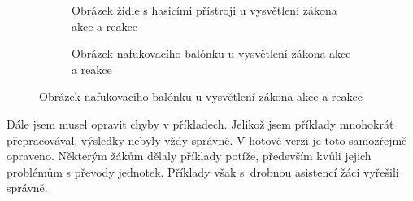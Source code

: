 \begin{figure}[H]
    \begingroup
    \makeatletter
    \renewcommand\thesubfigure{\thefigure~--~\@nameuse{subfiglabel@\alph{subfigure}}}
    \newcommand{\subfiglabel@a}{vlevo}
    \newcommand{\subfiglabel@b}{vpravo}
    \captionsetup[subfigure]{labelformat=simple, labelsep=colon}
    \renewcommand\p@subfigure{}
    \makeatother
    \begin{subfigure}{0.47\textwidth}
        \centering
        \setlength{\fboxsep}{0pt}
        \caption{Obrázek židle s hasicími přístroji u vysvětlení zákona akce a reakce \jaObr}
        \label{obr:zidlePrezentace}
    \end{subfigure}\hfill
    \begin{subfigure}{0.47\textwidth}
        \centering
        \setlength{\fboxsep}{0pt}
        \caption{Obrázek nafukovacího balónku u vysvětlení zákona akce a reakce \jaObr}
        \label{obr:balonekPrezentace}
    \end{subfigure}
    \endgroup
\end{figure}
{Dále jsem musel opravit chyby v příkladech. Jelikož jsem příklady mnohokrát přepracovával, výsledky nebyly vždy správné. V hotové verzi je toto samozřejmě opraveno. Některým žákům dělaly příklady potíže, především kvůli jejich problémům s převody jednotek. Příklady však s~drobnou asistencí žáci vyřešili správně.}
